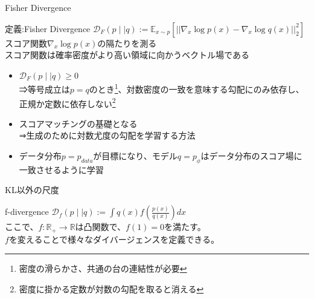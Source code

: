 \begin{frame}{Fisher Divergence}
    \begin{block}{定義:Fisher Divergence}
    \centering$\mathcal{D}_{F}(p\mid\mid q):=\mathbb{E}_{x\sim p}[||\nabla_x \log p(x)-\nabla_x \log q(x)||_{2}^{2}]$  \\
    スコア関数$\nabla_x \log p(x)$の隔たりを測る\\
    スコア関数は確率密度がより高い領域に向かうベクトル場である

\end{block}

    \begin{itemize}
        \item $\mathcal{D}_{F}(p\mid\mid q) \geq0$\\
        ⇒等号成立は$p=q$のとき\footnote{密度の滑らかさ、共通の台の連結性が必要}、対数密度の一致を意味する勾配にのみ依存し、正規か定数に依存しない\footnote{密度に掛かる定数が対数の勾配を取ると消える} \\
        \item スコアマッチングの基礎となる\\
        ⇒生成のために対数尤度の勾配を学習する方法\\
        \item データ分布$p=p_{data}$が目標になり、モデル$q=p_{\phi}$はデータ分布のスコア場に一致させるように学習\\
    \end{itemize}


\end{frame}
\begin{frame}{KL以外の尺度}
    \begin{block}{f-divergence}
        \centering$\mathcal{D}_{f}(p\mid\mid q):=\int q(x)\mathit{f}\left(\frac{p(x)}{q(x)}\right)dx$\\
        ここで、$\mathit{f}: \mathbb{R}_{+} \to \mathbb{R}$は凸関数で、$\mathit{f}(1)=0$を満たす。\\
        $\mathit{f}$を変えることで様々なダイバージェンスを定義できる。
    \end{block}
    \centering
{}


\end{frame}
